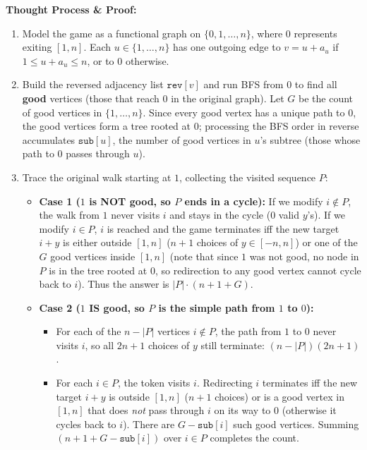 \documentclass[11pt]{article}
\begin{document}
\textbf{Thought Process \& Proof:}
\begin{enumerate}
    \item Model the game as a functional graph on $\{0, 1, \dots, n\}$, where $0$ represents exiting $[1, n]$. Each $u \in \{1, \dots, n\}$ has one outgoing edge to $v = u + a_u$ if $1 \le u + a_u \le n$, or to $0$ otherwise.
    \item Build the reversed adjacency list $\texttt{rev}[v]$ and run BFS from $0$ to find all \textbf{good} vertices (those that reach $0$ in the original graph). Let $G$ be the count of good vertices in $\{1, \dots, n\}$. Since every good vertex has a unique path to $0$, the good vertices form a tree rooted at $0$; processing the BFS order in reverse accumulates $\texttt{sub}[u]$, the number of good vertices in $u$'s subtree (those whose path to $0$ passes through $u$).
    \item Trace the original walk starting at $1$, collecting the visited sequence $P$:
    \begin{itemize}
        \item \textbf{Case 1 ($1$ is NOT good, so $P$ ends in a cycle):}
        If we modify $i \notin P$, the walk from $1$ never visits $i$ and stays in the cycle ($0$ valid $y$'s). If we modify $i \in P$, $i$ is reached and the game terminates iff the new target $i + y$ is either outside $[1, n]$ ($n + 1$ choices of $y \in [-n, n]$) or one of the $G$ good vertices inside $[1, n]$ (note that since $1$ was not good, no node in $P$ is in the tree rooted at $0$, so redirection to any good vertex cannot cycle back to $i$). Thus the answer is $|P| \cdot (n + 1 + G)$.
        \item \textbf{Case 2 ($1$ IS good, so $P$ is the simple path from $1$ to $0$):}
        \begin{itemize}
            \item For each of the $n - |P|$ vertices $i \notin P$, the path from $1$ to $0$ never visits $i$, so all $2n + 1$ choices of $y$ still terminate: $(n - |P|)(2n + 1)$.
            \item For each $i \in P$, the token visits $i$. Redirecting $i$ terminates iff the new target $i + y$ is outside $[1, n]$ ($n + 1$ choices) or is a good vertex in $[1, n]$ that does \emph{not} pass through $i$ on its way to $0$ (otherwise it cycles back to $i$). There are $G - \texttt{sub}[i]$ such good vertices. Summing $(n + 1 + G - \texttt{sub}[i])$ over $i \in P$ completes the count.
        \end{itemize}
    \end{itemize}
\end{enumerate}
\end{document}
